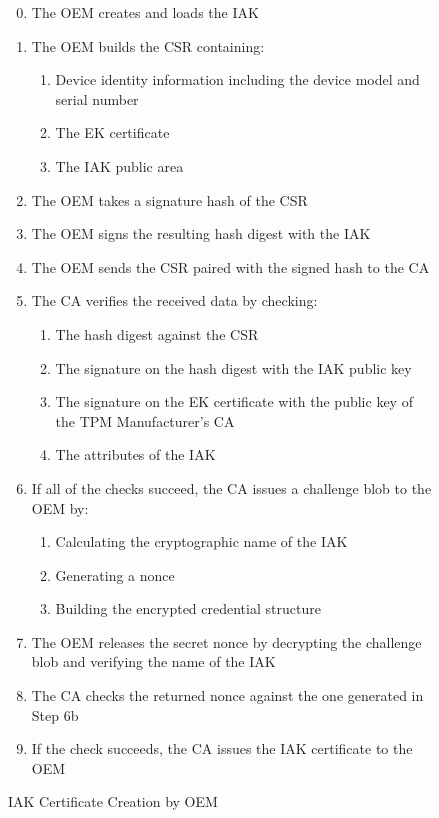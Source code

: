 \documentclass[runningheads]{llncs}
\begin{document}
\begin{figure}[hbtp]
\begin{enumerate}[itemsep=0pt,parsep=0pt,partopsep=0pt]
  \setcounter{enumi}{-1}
  \item The OEM creates and loads the IAK
  \item The OEM builds the CSR containing:
  \begin{enumerate}[topsep=0pt, itemsep=0pt,parsep=0pt,partopsep=0pt]
    \item Device identity information including the device model and serial
    number
    \item The EK certificate
    \item The IAK public area
  \end{enumerate}
  \item The OEM takes a signature hash of the CSR
  \item The OEM signs the resulting hash digest with the IAK
  \item The OEM sends the CSR paired with the signed hash to the CA
  \item The CA verifies the received data by checking:
  \begin{enumerate}[topsep=0pt, itemsep=0pt,parsep=0pt,partopsep=0pt]
    \item The hash digest against the CSR
    \item The signature on the hash digest with the IAK public key
    \item The signature on the EK certificate with the public key of the TPM Manufacturer's CA
    \item The attributes of the IAK
  \end{enumerate}
  \item If all of the checks succeed, the CA issues a challenge blob to the OEM by:
  \begin{enumerate}[topsep=0pt, itemsep=0pt,parsep=0pt,partopsep=0pt]
    \item Calculating the cryptographic name of the IAK
    \item Generating a nonce
    \item Building the encrypted credential structure
  \end{enumerate}
  \item The OEM releases the secret nonce by decrypting the challenge blob and verifying the name of the IAK
  \item The CA checks the returned nonce against the one generated in Step 6b
  \item If the check succeeds, the CA issues the IAK certificate to the OEM
  \end{enumerate}
  \caption{IAK Certificate Creation by OEM}
  \label{fig:iak-creation}
\end{figure}
\end{document}
